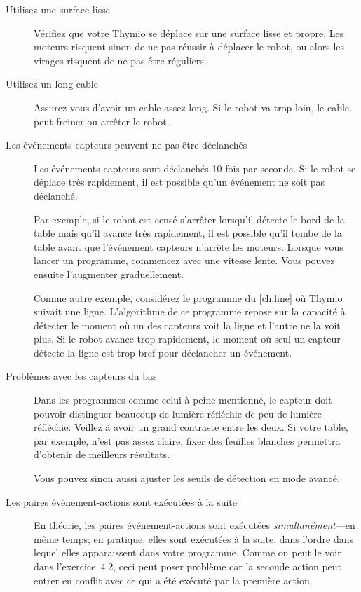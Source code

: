 \begin{description}

\item[Utilisez une surface lisse]
Vérifiez que votre Thymio se déplace sur une surface lisse et propre.
Les moteurs risquent sinon de ne pas réussir à déplacer le robot,
ou alors les virages risquent de ne pas être réguliers.

\item[Utilisez un long cable]
Assurez-vous d'avoir un cable assez long.
Si le robot va trop loin, le cable peut freiner ou arrêter le robot.

\item[Les événements capteurs peuvent ne pas être déclanchés]
Les événements capteurs sont déclanchés 10 fois par seconde.
Si le robot se déplace très rapidement, il est possible qu'un événement ne soit pas déclanché.

Par exemple, si le robot est censé s'arrêter lorsqu'il détecte le bord de la table
mais qu'il avance très rapidement, il est possible qu'il tombe de la table
avant que l'événement capteurs n'arrête les moteurs.
Lorsque vous lancer un programme, commencez avec une vitesse lente.
Vous pouvez ensuite l'augmenter graduellement.

Comme autre exemple, considérez le programme du \cref{ch.line} où Thymio suivait une ligne.
L'algorithme de ce programme repose sur la capacité à détecter le moment où
un des capteurs voit la ligne et l'autre ne la voit plus.
Si le robot avance trop rapidement, le moment où seul un capteur détecte la ligne 
est trop bref pour déclancher un événement.

\item[Problèmes avec les capteurs du bas]
Dans les programmes comme celui à peine mentionné,
le capteur doit pouvoir distinguer beaucoup de lumière réfléchie de peu de lumière réfléchie.
Veillez à avoir un grand contraste entre les deux.
Si votre table, par exemple, n'est pas assez claire, fixer des feuilles blanches 
permettra d'obtenir de meilleurs résultats.

Vous pouvez sinon aussi ajuster les seuils de détection en mode avancé.

\item[Les paires événement-actions sont exécutées à la suite]
En théorie, les paires événement-actions sont exécutées \emph{simultanément}---en même temps;
en pratique, elles sont exécutées à la suite, dans l'ordre dans lequel elles apparaissent 
dans votre programme.
Comme on peut le voir dans l'exercice~4.2, ceci peut poser problème car la seconde action
peut entrer en conflit avec ce qui a été exécuté par la première action.


\end{description}
